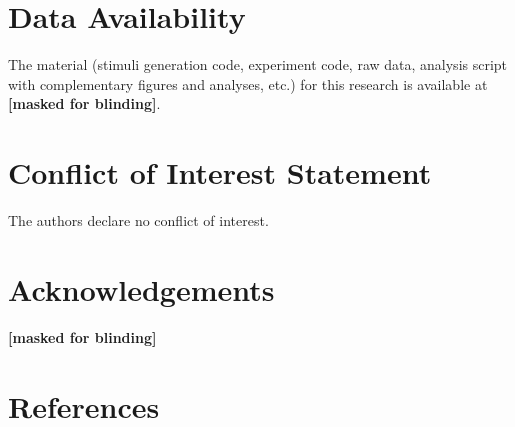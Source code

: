 \documentclass[
  man,mask,floatsintext]{apa6}
\begin{document}
\hypertarget{data-availability}{%
\section{Data Availability}\label{data-availability}}

The material (stimuli generation code, experiment code, raw data, analysis script with complementary figures and analyses, etc.) for this research is available at
\textbf{{[}masked for blinding{]}}.

\hypertarget{conflict-of-interest-statement}{%
\section{Conflict of Interest Statement}\label{conflict-of-interest-statement}}

The authors declare no conflict of interest.

\hypertarget{acknowledgements}{%
\section{Acknowledgements}\label{acknowledgements}}

\textbf{{[}masked for blinding{]}}

\newpage

\hypertarget{references}{%
\section{References}\label{references}}

\begingroup
\setlength{\parindent}{-0.5in}
\setlength{\leftskip}{0.5in}
\end{document}
